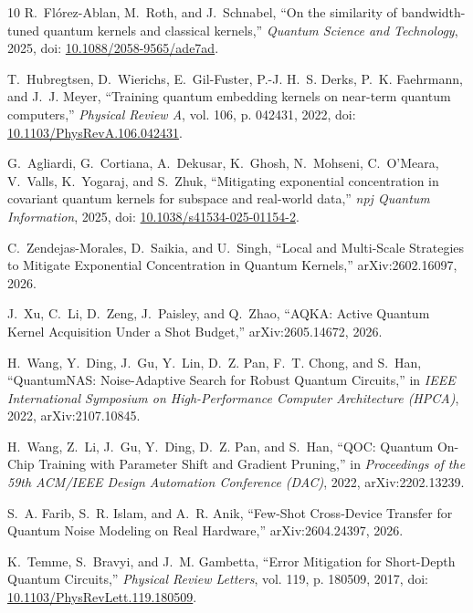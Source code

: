 \documentclass[10pt,conference]{IEEEtran}
\begin{document}
\begin{thebibliography}{10}
R.~Flórez-Ablan, M.~Roth, and J.~Schnabel, ``{On the similarity of
  bandwidth-tuned quantum kernels and classical kernels},'' \emph{Quantum
  Science and Technology}, 2025, doi:
  \href{https://doi.org/10.1088/2058-9565/ade7ad}{10.1088/2058-9565/ade7ad}.

T.~Hubregtsen, D.~Wierichs, E.~Gil-Fuster, P.-J. H.~S. Derks, P.~K. Faehrmann,
  and J.~J. Meyer, ``{Training quantum embedding kernels on near-term quantum
  computers},'' \emph{Physical Review A}, vol. 106, p. 042431, 2022, doi:
  \href{https://doi.org/10.1103/PhysRevA.106.042431}{10.1103/PhysRevA.106.042431}.

G.~Agliardi, G.~Cortiana, A.~Dekusar, K.~Ghosh, N.~Mohseni, C.~O'Meara,
  V.~Valls, K.~Yogaraj, and S.~Zhuk, ``{Mitigating exponential concentration in
  covariant quantum kernels for subspace and real-world data},'' \emph{npj
  Quantum Information}, 2025, doi:
  \href{https://doi.org/10.1038/s41534-025-01154-2}{10.1038/s41534-025-01154-2}.

C.~Zendejas-Morales, D.~Saikia, and U.~Singh, ``{Local and Multi-Scale
  Strategies to Mitigate Exponential Concentration in Quantum Kernels},''
  arXiv:2602.16097, 2026.

J.~Xu, C.~Li, D.~Zeng, J.~Paisley, and Q.~Zhao, ``{AQKA: Active Quantum Kernel
  Acquisition Under a Shot Budget},'' arXiv:2605.14672, 2026.

H.~Wang, Y.~Ding, J.~Gu, Y.~Lin, D.~Z. Pan, F.~T. Chong, and S.~Han,
  ``{QuantumNAS: Noise-Adaptive Search for Robust Quantum Circuits},'' in
  \emph{IEEE International Symposium on High-Performance Computer Architecture
  (HPCA)}, 2022, arXiv:2107.10845.

H.~Wang, Z.~Li, J.~Gu, Y.~Ding, D.~Z. Pan, and S.~Han, ``{QOC: Quantum On-Chip
  Training with Parameter Shift and Gradient Pruning},'' in \emph{Proceedings
  of the 59th ACM/IEEE Design Automation Conference (DAC)}, 2022,
  arXiv:2202.13239.

S.~A. Farib, S.~R. Islam, and A.~R. Anik, ``{Few-Shot Cross-Device Transfer for
  Quantum Noise Modeling on Real Hardware},'' arXiv:2604.24397, 2026.

K.~Temme, S.~Bravyi, and J.~M. Gambetta, ``{Error Mitigation for Short-Depth
  Quantum Circuits},'' \emph{Physical Review Letters}, vol. 119, p. 180509,
  2017, doi:
  \href{https://doi.org/10.1103/PhysRevLett.119.180509}{10.1103/PhysRevLett.119.180509}.


\end{thebibliography}
\end{document}
